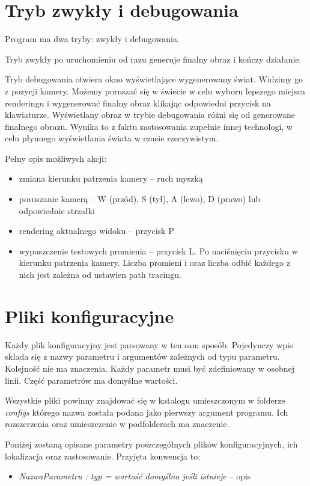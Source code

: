 \documentclass[inz,longabstract]{iithesis}
\begin{document}
    \section{Tryb zwykły i debugowania}
        Program ma dwa tryby: zwykły i debugowania. 
        
        Tryb zwykły po uruchomieniu od razu generuje finalny obraz i kończy działanie. 
        
        Tryb debugowania otwiera okno wyświetlające wygenerowany świat. Widzimy go z pozycji kamery. Możemy poruszać się w świecie w celu wyboru lepszego miejsca renderingu i wygenerować finalny obraz klikając odpowiedni przycisk na klawiaturze. Wyświetlany obraz w trybie debugowania różni się od generowane finalnego obrazu. Wynika to z faktu zastosowania zupełnie innej technologi, w celu płynnego wyświetlania świata w czasie rzeczywistym.
        
        Pełny opis możliwych akcji:
        \begin{itemize}
            \item zmiana kierunku patrzenia kamery -- ruch myszką
            \item poruszanie kamerą -- W (przód), S (tył), A (lewo), D (prawo) lub odpowiednie strzałki
            \item rendering aktualnego widoku -- przycisk P
            \item wypuszczenie testowych promienia -- przycisk L. Po naciśnięciu przycisku w kierunku patrzenia kamery. Liczba promieni i oraz liczba odbić każdego z nich jest zależna od ustawien path tracingu.
        \end{itemize}
    \section{Pliki konfiguracyjne}
        Każdy plik konfiguracyjny jest parsowany w ten sam sposób. Pojedynczy wpis składa się z nazwy parametru i argumentów zależnych od typu parametru. Kolejność nie ma znaczenia. Każdy parametr musi być zdefiniowany w osobnej linii. Część parametrów ma domyślne wartości. 
        
        Wszystkie pliki powinny znajdować się w katalogu umieszczonym w folderze \textit{configs} którego nazwa została podana jako pierwszy argument programu. Ich rozszerzenia oraz umieszczenie w podfolderach ma znaczenie.
        
        Poniżej zostaną opisane parametry poszczególnych plików konfiguracyjnych, ich lokalizacja oraz zastosowanie. Przyjęta konwencja to:
        \begin{itemize}
            \item \textit{NazwaParametru : typ = wartość domyślna jeśli istnieje} -- opis
        \end{itemize}
        
\end{document}
